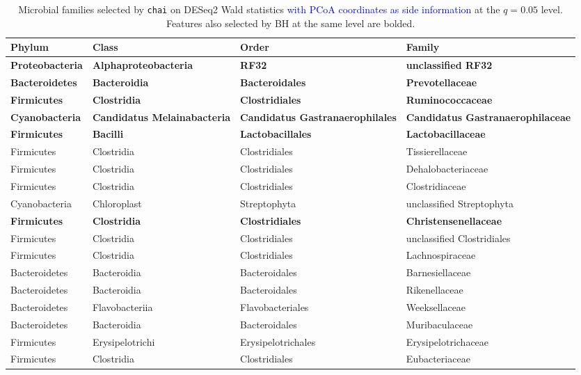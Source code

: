 \begin{table}[ht]
\centering
\small
\renewcommand{\arraystretch}{1.1}
\begin{tabular}{llll}
\toprule
\textbf{Phylum} & \textbf{Class} & \textbf{Order} & \textbf{Family} \\
\midrule
{\bfseries Proteobacteria} & {\bfseries Alphaproteobacteria} & {\bfseries RF32} & {\bfseries unclassified RF32} \\
{\bfseries Bacteroidetes} & {\bfseries Bacteroidia} & {\bfseries Bacteroidales} & {\bfseries Prevotellaceae} \\
{\bfseries Firmicutes} & {\bfseries Clostridia} & {\bfseries Clostridiales} & {\bfseries Ruminococcaceae} \\
{\bfseries Cyanobacteria} & {\bfseries Candidatus Melainabacteria} & {\bfseries Candidatus Gastranaerophilales} & {\bfseries Candidatus Gastranaerophilaceae} \\
{\bfseries Firmicutes} & {\bfseries Bacilli} & {\bfseries Lactobacillales} & {\bfseries Lactobacillaceae} \\
Firmicutes & Clostridia & Clostridiales & Tissierellaceae \\
Firmicutes & Clostridia & Clostridiales & Dehalobacteriaceae \\
Firmicutes & Clostridia & Clostridiales & Clostridiaceae \\
Cyanobacteria & Chloroplast & Streptophyta & unclassified Streptophyta \\
{\bfseries Firmicutes} & {\bfseries Clostridia} & {\bfseries Clostridiales} & {\bfseries Christensenellaceae} \\
Firmicutes & Clostridia & Clostridiales & unclassified Clostridiales \\
Firmicutes & Clostridia & Clostridiales & Lachnospiraceae \\
Bacteroidetes & Bacteroidia & Bacteroidales & Barnesiellaceae \\
Bacteroidetes & Bacteroidia & Bacteroidales & Rikenellaceae \\
Bacteroidetes & Flavobacteriia & Flavobacteriales & Weeksellaceae \\
Bacteroidetes & Bacteroidia & Bacteroidales & Muribaculaceae \\
Firmicutes & Erysipelotrichi & Erysipelotrichales & Erysipelotrichaceae \\
Firmicutes & Clostridia & Clostridiales & Eubacteriaceae \\
\bottomrule
\end{tabular}
\caption{Microbial families selected by \texttt{chai} on DESeq2 Wald statistics \textcolor{blue}{with PCoA coordinates as side information} at the $q=0.05$ level. Features also selected by BH at the same level are bolded.}
\label{tab:16s_DES_pcoa_chai_bh_q005}
\end{table}
